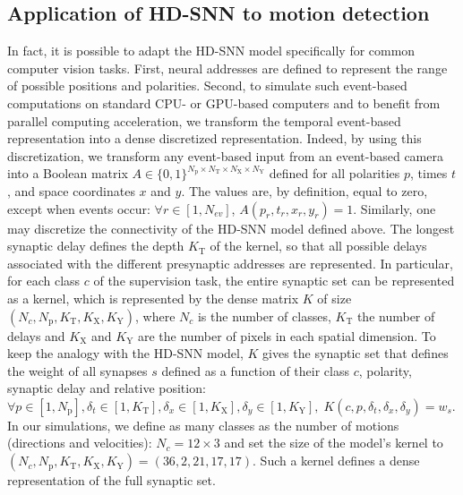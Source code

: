 \documentclass[default]{sn-jnl}%
\theoremstyle{thmstyleone}%
\theoremstyle{thmstyletwo}%
\theoremstyle{thmstylethree}%
\newcommand{\numevent}{N_{ev}} %
\newcommand{\Npol}{N_\text{p}} %
\newcommand{\arank}{r} %
\newcommand{\synapticweight}{w} %
\newcommand{\synapticdelay}{\delta} %
\newcommand{\ranksyn}{s} %
\newcommand{\timev}{t} %
\newcommand{\polev}{p} %
\newcommand{\Nx}{N_\text{X}}
\newcommand{\Ny}{N_\text{Y}}
\newcommand{\Ntime}{N_\text{T}}
\newcommand{\kernel}{K} %
\newcommand{\Kx}{K_\text{X}}
\newcommand{\Ky}{K_\text{Y}}
\newcommand{\Ktime}{K_\text{T}}
\newcommand{\class}{c} %
\newcommand{\Nclass}{N_\class} %
\begin{document}
\subsection{Application of HD-SNN to motion detection}
%
In fact, it is possible to adapt the HD-SNN model specifically for common computer vision tasks. First, neural addresses are defined to represent the range of possible positions and polarities. Second, to simulate such event-based computations on standard CPU- or GPU-based computers and to benefit from parallel computing acceleration, we transform the temporal event-based representation into a dense discretized representation. Indeed, by using this discretization, we transform any event-based input from an event-based camera into a Boolean matrix $A \in \{0, 1 \}^{\Npol \times \Ntime \times \Nx \times \Ny}$ defined for all polarities $p$, times $t$, and space coordinates $x$ and $y$. The values are, by definition, equal to zero, except when events occur: $\forall \arank \in [1,\numevent]$, $A(\polev_\arank, t_\arank, x_\arank, y_\arank)=1$. Similarly, one may discretize the connectivity of the HD-SNN model defined above. The longest synaptic delay defines the depth $\Ktime$ of the kernel, so that all possible delays associated with the different presynaptic addresses are represented. In particular, for each class $\class$ of the supervision task, the entire synaptic set can be represented as a kernel, which is represented by the dense matrix $\kernel$ of size $(\Nclass, \Npol, \Ktime, \Kx, \Ky)$, where $\Nclass$ is the number of classes, $\Ktime$ the number of delays and $\Kx$ and $\Ky$ are the number of pixels in each spatial dimension. To keep the analogy with the HD-SNN model, $\kernel$ gives the synaptic set that defines the weight of all synapses $\ranksyn$ defined as a function of their class $\class$, polarity, synaptic delay and relative position: $\forall {\polev \in [1, \Npol], \delta_\timev \in [1, \Ktime], \delta_x \in [1, \Kx], \delta_y \in [1, \Ky]}, \; \kernel(\class, \polev, \synapticdelay_\timev, \delta_x, \delta_y) = \synapticweight_\ranksyn$. In our simulations, we define as many classes as the number of motions (directions and velocities): $\Nclass = 12 \times 3$ and set the size of the model's kernel to $(\Nclass, \Npol, \Ktime, \Kx, \Ky) = (36, 2, 21, 17, 17)$. Such a kernel defines a dense representation of the full synaptic set. %
\end{document}
